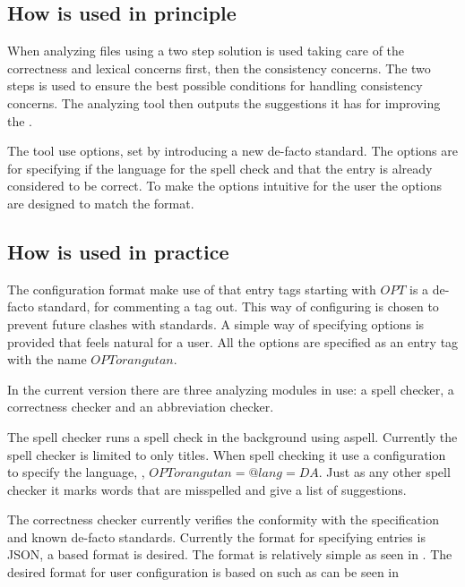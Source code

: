\subsection{How {\orangutan} is used in principle}

When analyzing {\bibtex} files using a two step solution is used
taking care of the correctness and lexical concerns first, then the
consistency concerns.  The two steps is used to ensure the best
possible conditions for handling consistency concerns.  The analyzing
tool then outputs the suggestions it has for improving the .

The tool use options, set by introducing a new de-facto standard.  The
options are for specifying if the language for the spell check and
that the entry is already considered to be correct.  To make the
options intuitive for the {\bibtex} user the options are designed to
match the {\bibtex} format.


\subsection{How {\orangutan} is used in practice}

The configuration format make use of that entry tags starting with
$OPT$ is a de-facto standard, for commenting a tag out.  This way of
configuring is chosen to prevent future clashes with standards.  A
simple way of specifying options is provided that feels natural for a
{\bibtex} user.  All the options are specified as an entry tag with
the name $OPTorangutan$.

In the current version there are three analyzing modules in use: a
spell checker, a correctness checker and an abbreviation checker.

The spell checker runs a spell check in the background using aspell.
Currently the spell checker is limited to only titles.  When spell
checking it use a configuration to specify the language, \eg,
$OPTorangutan = {@lang=DA}$.  Just as any other spell checker it marks
words that are misspelled and give a list of suggestions.

The correctness checker currently verifies the conformity with the
{\bibtex} specification and known de-facto standards.  Currently the
format for specifying entries is JSON, a {\bibtex} based format is
desired.  The format is relatively simple as seen in
.  The desired format for user
configuration is based on {\bibtex} such as can be seen in

